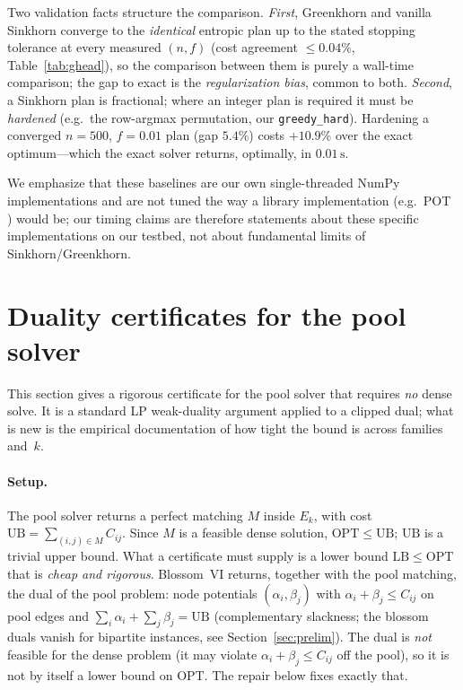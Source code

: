 \documentclass[11pt]{article}
\theoremstyle{remark}
\begin{document}
Two validation facts structure the comparison. \emph{First}, Greenkhorn and
vanilla Sinkhorn converge to the \emph{identical} entropic plan up to the
stated stopping tolerance at every measured $(n,f)$ (cost agreement
$\le 0.04\%$, Table~\ref{tab:ghead}), so the comparison between them is
purely a wall-time comparison; the gap to exact is the \emph{regularization
bias}, common to both. \emph{Second}, a Sinkhorn plan is fractional; where
an integer plan is required it must be \emph{hardened} (e.g.\ the
row-argmax permutation, our \texttt{greedy\_hard}). Hardening a converged
$n=500$, $f=0.01$ plan (gap $5.4\%$) costs $+10.9\%$ over the exact
optimum---which the exact solver returns, optimally, in $0.01\,\mathrm{s}$.

We emphasize that these baselines are our own single-threaded NumPy
implementations and are not tuned the way a library implementation (e.g.\
POT \cite{flamary2021pot}) would be; our timing claims are therefore
statements about these specific implementations on our testbed, not about
fundamental limits of Sinkhorn/Greenkhorn.

\section{Duality certificates for the pool solver}
\label{sec:cert}

This section gives a rigorous certificate for the pool solver that
requires \emph{no} dense solve. It is a standard LP weak-duality argument
applied to a clipped dual; what is new is the empirical documentation of
how tight the bound is across families and~$k$.

\paragraph{Setup.} The pool solver returns a perfect matching $M$ inside
$E_k$, with cost $\mathrm{UB}=\sum_{(i,j)\in M} C_{ij}$. Since $M$ is a
feasible dense solution, $\mathrm{OPT}\le \mathrm{UB}$; $\mathrm{UB}$ is a
trivial upper bound. What a certificate must supply is a lower bound
$\mathrm{LB}\le\mathrm{OPT}$ that is \emph{cheap and rigorous}. Blossom~VI
returns, together with the pool matching, the dual of the pool problem:
node potentials $(\alpha_i,\beta_j)$ with
$\alpha_i+\beta_j\le C_{ij}$ on pool edges and
$\sum_i\alpha_i+\sum_j\beta_j=\mathrm{UB}$ (complementary slackness; the
blossom duals vanish for bipartite instances, see Section~\ref{sec:prelim}).
The dual is \emph{not} feasible for the dense problem (it may violate
$\alpha_i+\beta_j\le C_{ij}$ off the pool), so it is not by itself a lower
bound on $\mathrm{OPT}$. The repair below fixes exactly that.
\end{document}
